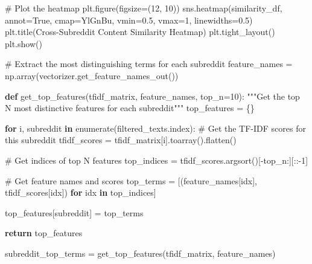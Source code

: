 \documentclass[
  12pt,
  letterpaper,
  DIV=11,
  numbers=noendperiod]{scrartcl}
\newenvironment{Shaded}{\begin{snugshade}}{\end{snugshade}}
\newcommand{\BuiltInTok}[1]{\textcolor[rgb]{0.00,0.23,0.31}{#1}}
\newcommand{\CommentTok}[1]{\textcolor[rgb]{0.37,0.37,0.37}{#1}}
\newcommand{\ControlFlowTok}[1]{\textcolor[rgb]{0.00,0.23,0.31}{\textbf{#1}}}
\newcommand{\DecValTok}[1]{\textcolor[rgb]{0.68,0.00,0.00}{#1}}
\newcommand{\FloatTok}[1]{\textcolor[rgb]{0.68,0.00,0.00}{#1}}
\newcommand{\KeywordTok}[1]{\textcolor[rgb]{0.00,0.23,0.31}{\textbf{#1}}}
\newcommand{\NormalTok}[1]{\textcolor[rgb]{0.00,0.23,0.31}{#1}}
\newcommand{\OperatorTok}[1]{\textcolor[rgb]{0.37,0.37,0.37}{#1}}
\newcommand{\StringTok}[1]{\textcolor[rgb]{0.13,0.47,0.30}{#1}}
\newcommand{\VariableTok}[1]{\textcolor[rgb]{0.07,0.07,0.07}{#1}}
\begin{document}
\begin{Shaded}
\begin{Highlighting}[]
\CommentTok{\# Plot the heatmap}
\NormalTok{plt.figure(figsize}\OperatorTok{=}\NormalTok{(}\DecValTok{12}\NormalTok{, }\DecValTok{10}\NormalTok{))}
\NormalTok{sns.heatmap(similarity\_df, annot}\OperatorTok{=}\VariableTok{True}\NormalTok{, cmap}\OperatorTok{=}\StringTok{\textquotesingle{}YlGnBu\textquotesingle{}}\NormalTok{, vmin}\OperatorTok{=}\FloatTok{0.5}\NormalTok{, vmax}\OperatorTok{=}\DecValTok{1}\NormalTok{, linewidths}\OperatorTok{=}\FloatTok{0.5}\NormalTok{)}
\NormalTok{plt.title(}\StringTok{\textquotesingle{}Cross{-}Subreddit Content Similarity Heatmap\textquotesingle{}}\NormalTok{)}
\NormalTok{plt.tight\_layout()}
\NormalTok{plt.show()}

\CommentTok{\# Extract the most distinguishing terms for each subreddit}
\NormalTok{feature\_names }\OperatorTok{=}\NormalTok{ np.array(vectorizer.get\_feature\_names\_out())}

\KeywordTok{def}\NormalTok{ get\_top\_features(tfidf\_matrix, feature\_names, top\_n}\OperatorTok{=}\DecValTok{10}\NormalTok{):}
    \CommentTok{"""Get the top N most distinctive features for each subreddit"""}
\NormalTok{    top\_features }\OperatorTok{=}\NormalTok{ \{\}}
    
    \ControlFlowTok{for}\NormalTok{ i, subreddit }\KeywordTok{in} \BuiltInTok{enumerate}\NormalTok{(filtered\_texts.index):}
        \CommentTok{\# Get the TF{-}IDF scores for this subreddit}
\NormalTok{        tfidf\_scores }\OperatorTok{=}\NormalTok{ tfidf\_matrix[i].toarray().flatten()}
        
        \CommentTok{\# Get indices of top N features}
\NormalTok{        top\_indices }\OperatorTok{=}\NormalTok{ tfidf\_scores.argsort()[}\OperatorTok{{-}}\NormalTok{top\_n:][::}\OperatorTok{{-}}\DecValTok{1}\NormalTok{]}
        
        \CommentTok{\# Get feature names and scores}
\NormalTok{        top\_terms }\OperatorTok{=}\NormalTok{ [(feature\_names[idx], tfidf\_scores[idx]) }\ControlFlowTok{for}\NormalTok{ idx }\KeywordTok{in}\NormalTok{ top\_indices]}
        
\NormalTok{        top\_features[subreddit] }\OperatorTok{=}\NormalTok{ top\_terms}
    
    \ControlFlowTok{return}\NormalTok{ top\_features}

\NormalTok{subreddit\_top\_terms }\OperatorTok{=}\NormalTok{ get\_top\_features(tfidf\_matrix, feature\_names)}


\end{Highlighting}
\end{Shaded}
\end{document}
